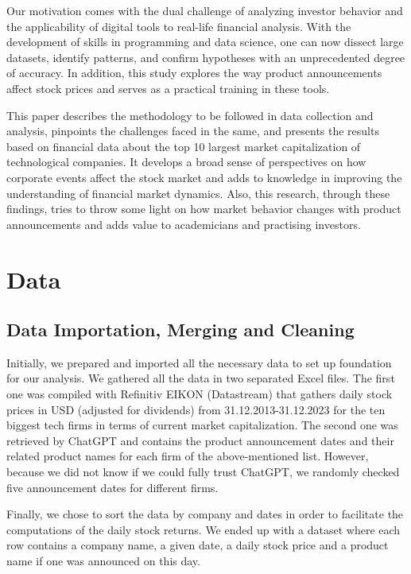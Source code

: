 \documentclass[12pt, oneside]{article}
\begin{document}
Our motivation comes with the dual challenge of analyzing investor behavior and the applicability of digital tools to real-life financial analysis. With the development of skills in programming and data science, one can now dissect large datasets, identify patterns, and confirm hypotheses with an unprecedented degree of accuracy. In addition, this study explores the way product announcements affect stock prices and serves as a practical training in these tools.


This paper describes the methodology to be followed in data collection and analysis, pinpoints the challenges faced in the same, and presents the results based on financial data about the top 10 largest market capitalization of technological companies. It develops a broad sense of perspectives on how corporate events affect the stock market and adds to knowledge in improving the understanding of financial market dynamics. Also, this research, through these findings, tries to throw some light on how market behavior changes with product announcements and adds value to academicians and practising investors.



\section{Data}

\subsection{Data Importation, Merging and Cleaning}
Initially, we prepared and imported all the necessary data to set up foundation for our analysis. We gathered all the data in two separated Excel files.
The first one was compiled with Refinitiv EIKON (Datastream) that gathers daily stock prices in USD (adjusted for dividends) from 31.12.2013-31.12.2023 for the ten biggest tech firms in terms of current market capitalization. The second one was retrieved by ChatGPT and contains the product announcement dates and their related product names for each firm of the above-mentioned list. However, because we did not know if we could fully trust ChatGPT, we randomly checked five announcement dates for different firms.

Finally, we chose to sort the data by company and dates in order to facilitate the computations of the daily stock returns. We ended up with a dataset where each row contains a company name, a given date, a daily stock price and a product name if one was announced on this day.
\end{document}
